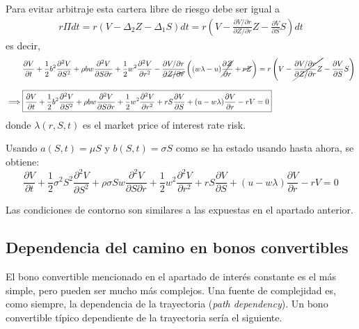 Para evitar arbitraje esta cartera libre de riesgo debe ser igual a
\begin{align*}
    r \Pi dt = r \left( V - \Delta_2 Z - \Delta_1 S \right) dt = r \left( V - \frac{\partial V/\partial r}{\partial Z/\partial r} Z - \frac{\partial V}{\partial S} S \right) dt
\end{align*}
es decir,
\begin{align*}
    &\frac{\partial V}{\partial t} + \frac{1}{2} b^2 \frac{\partial^2 V}{\partial S^2} + \rho b w \frac{\partial^2 V}{\partial S \partial r} + \frac{1}{2} w^2 \frac{\partial^2 V}{\partial r^2} - \frac{\partial V/\partial r}{\cancel{\partial Z/\partial r}} \left((w\lambda - u) \cancel{\frac{\partial Z}{\partial r}} + \cancel{rZ} \right) = r \left( V - \cancel{\frac{\partial V/\partial r}{\partial Z/\partial r} Z} - \frac{\partial V}{\partial S} S \right) \\[2ex]
    \implies & \boxed{\frac{\partial V}{\partial t} + \frac{1}{2} b^2 \frac{\partial^2 V}{\partial S^2} + \rho b w \frac{\partial^2 V}{\partial S \partial r} + \frac{1}{2} w^2 \frac{\partial^2 V}{\partial r^2} + rS \frac{\partial V}{\partial S} + (u - w\lambda )\frac{\partial V}{\partial r} - rV = 0}
\end{align*}
donde $\lambda(r,S,t)$ es el market price of interest rate risk.

Usando $a(S,t) = \mu S$ y $b(S,t) = \sigma S$ como se ha estado usando hasta ahora, se obtiene:
\begin{equation*}
    \boxed{\frac{\partial V}{\partial t} + \frac{1}{2} \sigma^2 S^2 \frac{\partial^2 V}{\partial S^2} + \rho \sigma S w \frac{\partial^2 V}{\partial S \partial r} + \frac{1}{2} w^2 \frac{\partial^2 V}{\partial r^2} + rS \frac{\partial V}{\partial S} + (u - w\lambda )\frac{\partial V}{\partial r} - rV = 0}
\end{equation*}

Las condiciones de contorno son similares a las expuestas en el apartado anterior.



\subsection{Dependencia del camino en bonos convertibles}

El bono convertible mencionado en el apartado de interés constante es el más simple, pero pueden ser mucho más complejos. Una fuente de complejidad es, como siempre, la dependencia de la trayectoria (\textit{path dependency}). Un bono convertible típico dependiente de la trayectoria sería el siguiente.

